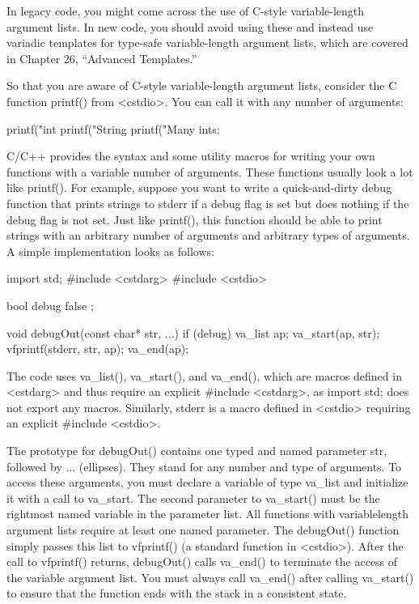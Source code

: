 

In legacy code, you might come across the use of C-style variable-length argument lists. In new code, you should avoid using these and instead use variadic templates for type-safe variable-length argument lists, which are covered in Chapter 26, “Advanced Templates.”

So that you are aware of C-style variable-length argument lists, consider the C function printf() from <cstdio>. You can call it with any number of arguments:

\begin{cpp}
printf("int %
printf("String %
printf("Many ints: %
\end{cpp}

C/C++ provides the syntax and some utility macros for writing your own functions with a variable number of arguments. These functions usually look a lot like printf(). For example, suppose you want to write a quick-and-dirty debug function that prints strings to stderr if a debug flag is set but does nothing if the debug flag is not set. Just like printf(), this function should be able to print strings with an arbitrary number of arguments and arbitrary types of arguments. A simple implementation looks as follows:

\begin{cpp}
import std;
#include <cstdarg>
#include <cstdio>

bool debug { false };

void debugOut(const char* str, ...)
{
    if (debug) {
        va_list ap;
        va_start(ap, str);
        vfprintf(stderr, str, ap);
        va_end(ap);
    }
}
\end{cpp}

The code uses va\_list(), va\_start(), and va\_end(), which are macros defined in <cstdarg> and thus require an explicit \#include <cstdarg>, as import std; does not export any macros. Similarly, stderr is a macro defined in <cstdio> requiring an explicit \#include <cstdio>.

The prototype for debugOut() contains one typed and named parameter str, followed by ... (ellipses). They stand for any number and type of arguments. To access these arguments, you must declare a variable of type va\_list and initialize it with a call to va\_start. The second parameter to va\_start() must be the rightmost named variable in the parameter list. All functions with variablelength argument lists require at least one named parameter. The debugOut() function simply passes this list to vfprintf() (a standard function in <cstdio>). After the call to vfprintf() returns, debugOut() calls va\_end() to terminate the access of the variable argument list. You must always call va\_end() after calling va\_start() to ensure that the function ends with the stack in a consistent state.


